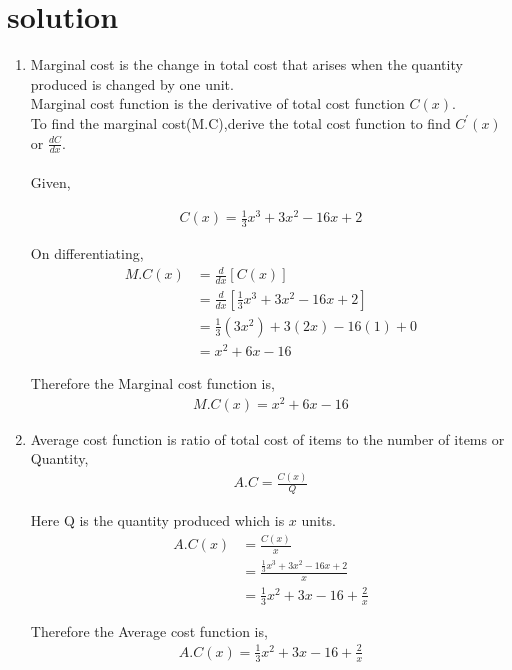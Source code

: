 \documentclass[article,12pt,twocolumn]{IEEEtran}
\begin{document}
  \section*{solution}
     \begin{enumerate}[ label=(\roman*)]
    \item Marginal cost is the change in total cost that arises when the quantity produced is changed by one unit. \\
          Marginal cost function is the derivative of total cost function $C(x)$.\\
          To find the marginal cost(M.C),derive the total cost function to find $C^{\prime}(x)$ or $\frac{dC}{dx}$. \\\\
      Given,
      
          \begin{align}
            C(x) = \frac{1}{3}x^3 + 3x^2 - 16x +2
          \end{align}
          
      On differentiating,
          \begin{align}
            M.C(x) &= \frac{d}{dx} [C(x)]
            \\
            &= \frac{d}{dx} [\frac{1}{3}x^3 + 3x^2 - 16x +2] 
            \\
            &= \frac{1}{3}(3x^2) + 3(2x)-16(1)+0 
            \\
            &= x^2+6x-16
          \end{align}  
          
      Therefore the Marginal cost function is,
          \begin{align*}
            M.C(x)=x^2+6x-16
          \end{align*}        
      
    \item Average cost function is ratio of total cost of items to the number of items or Quantity,
         \begin{align}
           A.C=\frac{C(x)}{Q}
         \end{align}
         
    Here Q is the quantity produced which is $x$ units.
        \begin{align}
          A.C(x) &=\frac{C(x)}{x} 
          \\
          &=\frac{\frac{1}{3}x^3 + 3x^2 - 16x +2}{x} 
          \\
          &=\frac{1}{3}x^2 + 3x - 16 +\frac{2}{x}
        \end{align}    
               
    Therefore the Average cost function is,
         \begin{align*}
           A.C(x)=\frac{1}{3}x^2 + 3x - 16 +\frac{2}{x}
         \end{align*}
         
   \end{enumerate}
   
\end{document}
